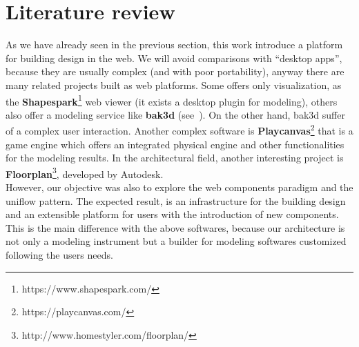 \section{Literature review}\label{sec:literature}

As we have already seen in the previous section, this work introduce a platform for building design in the web. We will avoid comparisons with ``desktop apps'', because they are usually complex (and with poor portability), anyway there are many related projects built as web platforms. Some offers only visualization, as the \textbf{Shapespark}\footnote{https://www.shapespark.com/} web viewer (it exists a desktop plugin for modeling), others also offer a modeling service like \textbf{bak3d} (see~\cite{Spini:2016:WIA:2945292.2945309}). On the other hand, bak3d suffer of a complex user interaction. Another complex software is \textbf{Playcanvas}\footnote{https://playcanvas.com/} that is a game engine which offers an integrated physical engine and other functionalities for the modeling results. In the architectural field, another interesting project is \textbf{Floorplan}\footnote{http://www.homestyler.com/floorplan/}, developed by Autodesk.\\
However, our objective was also to explore the web components paradigm and the uniflow pattern. The expected result, is an infrastructure for the building design and an extensible platform for users with the introduction of new components. This is the main difference with the above softwares, because our architecture is not only a modeling instrument but a builder for modeling softwares customized following the users needs.